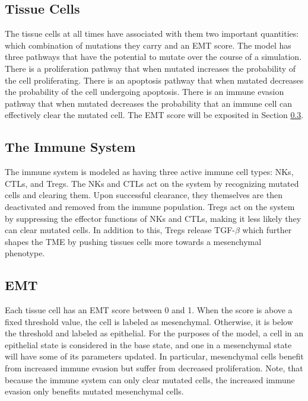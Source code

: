 \documentclass[11pt, a4paper, preprint]{article}
\begin{document}
\subsection{Tissue Cells}\label{TissueCells}
The tissue cells at all times have associated with them two important quantities: which combination of mutations they carry and an EMT score.
The model has three pathways that have the potential to mutate over the course of a simulation.
There is a proliferation pathway that when mutated increases the probability of the cell proliferating.
There is an apoptosis pathway that when mutated decreases the probability of the cell undergoing apoptosis.
There is an immune evasion pathway that when mutated decreases the probability that an immune cell can effectively clear the mutated cell.
The EMT score will be exposited in Section \ref{EMT}. %



\subsection{The Immune System}\label{ImmuneSystem}
The immune system is modeled as having three active immune cell types: NKs, CTLs, and Tregs.
The NKs and CTLs act on the system by recognizing mutated cells and clearing them.
Upon successful clearance, they themselves are then deactivated and removed from the immune population.
Tregs act on the system by suppressing the effector functions of NKs and CTLs, making it less likely they can clear mutated cells.
In addition to this, Tregs release TGF-$\beta$ which further shapes the TME by pushing tissues cells more towards a mesenchymal phenotype.

\subsection{EMT}\label{EMT}
Each tissue cell has an EMT score between 0 and 1.
When the score is above a fixed threshold value, the cell is labeled as mesenchymal.
Otherwise, it is below the threshold and labeled as epithelial.
For the purposes of the model, a cell in an epithelial state is considered in the base state, and one in a mesenchymal state will have some of its parameters updated.
In particular, mesenchymal cells benefit from increased immune evasion but suffer from decreased proliferation.
Note, that because the immune system can only clear mutated cells, the increased immune evasion only benefits mutated mesenchymal cells.
\end{document}
